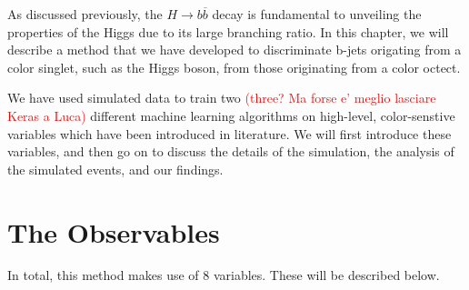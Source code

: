 \documentclass[10pt,a4paper]{book}
\newcommand\todo[1]{\textcolor{red}{#1}}
\begin{document}
As discussed previously, the $H\rightarrow b\overline{b}$ decay is fundamental to unveiling the properties of the Higgs due to its large branching ratio. In this chapter, we will describe a method that we have developed to discriminate b-jets origating from a color singlet, such as the Higgs boson, from those originating from a color octect. 

We have used simulated data to train two \todo{(three? Ma forse e' meglio lasciare Keras a Luca)} different machine learning algorithms on high-level, color-senstive variables which have been introduced in literature. We will first introduce these variables, and then go on to discuss the details of the simulation, the analysis of the simulated events, and our findings.

\section{The Observables}
In total, this method makes use of 8 variables. These will be described below. 
\end{document}
